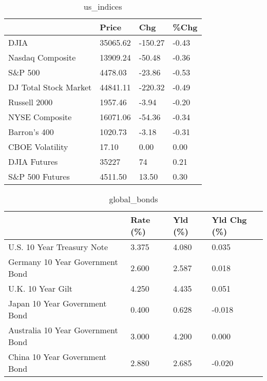 \documentclass{article}%
\begin{document}
%


\begin{table}[htbp]%
\caption{us\_indices}%
\centering%
\begin{adjustbox}{width=1\textwidth}%
\begin{tabular}{llll}
\toprule
                      &    Price &     Chg &  \%Chg \\
\midrule
                 DJIA & 35065.62 & -150.27 & -0.43 \\
     Nasdaq Composite & 13909.24 &  -50.48 & -0.36 \\
              S\&P 500 &  4478.03 &  -23.86 & -0.53 \\
DJ Total Stock Market & 44841.11 & -220.32 & -0.49 \\
         Russell 2000 &  1957.46 &   -3.94 & -0.20 \\
       NYSE Composite & 16071.06 &  -54.36 & -0.34 \\
         Barron's 400 &  1020.73 &   -3.18 & -0.31 \\
      CBOE Volatility &    17.10 &    0.00 &  0.00 \\
         DJIA Futures &    35227 &      74 &  0.21 \\
      S\&P 500 Futures &  4511.50 &   13.50 &  0.30 \\
\bottomrule
\end{tabular}
%
\end{adjustbox}%
\end{table}

%


\begin{table}[htbp]%
\caption{global\_bonds}%
\centering%
\begin{adjustbox}{width=1\textwidth}%
\begin{tabular}{llll}
\toprule
                                  & Rate (\%) & Yld (\%) & Yld Chg (\%) \\
\midrule
       U.S. 10 Year Treasury Note &    3.375 &   4.080 &       0.035 \\
  Germany 10 Year Government Bond &    2.600 &   2.587 &       0.018 \\
                U.K. 10 Year Gilt &    4.250 &   4.435 &       0.051 \\
    Japan 10 Year Government Bond &    0.400 &   0.628 &      -0.018 \\
Australia 10 Year Government Bond &    3.000 &   4.200 &       0.000 \\
    China 10 Year Government Bond &    2.880 &   2.685 &      -0.020 \\
\bottomrule
\end{tabular}
%
\end{adjustbox}%
\end{table}
\end{document}
